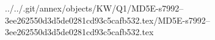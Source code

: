 ../../.git/annex/objects/KW/Q1/MD5E-s7992--3ee262550d3d5de0281cd93c5cafb532.tex/MD5E-s7992--3ee262550d3d5de0281cd93c5cafb532.tex